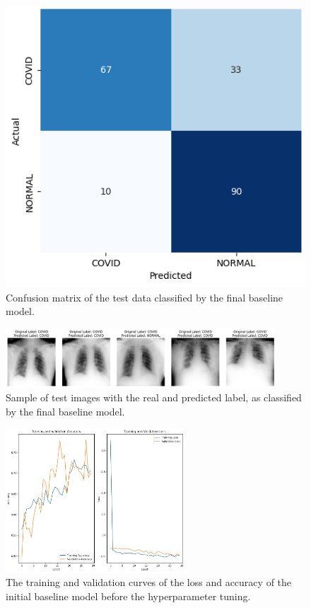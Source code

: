 \documentclass[conference]{IEEEtran}
\begin{document}
\begin{figure}[t] \centering 						\includegraphics[width=0.9\columnwidth]{fig_task2_confusionmatrix.png} 
	\caption{Confusion matrix of the test data classified by the final baseline model.} 
	\label{fig:task2_confusionmatrix} 
\end{figure}


\begin{figure}[t] \centering \includegraphics[width=0.9\textwidth]{fig_task2_examples_images_label_vs_predictedlabel.png} 
	\caption{Sample of test images with the real and predicted label, as classified by the final baseline model.} 
	\label{fig:task2_image_examples} 
\end{figure}

\begin{figure}[t] \centering \includegraphics[width=0.6\textwidth]{fig_task2_training_curves_train_validation_initial_model.png} 
	\caption{The training and validation curves of the loss and accuracy of the initial baseline model before the hyperparameter tuning.} 
	\label{fig:task2_curves_initial} 
\end{figure}
\end{document}
